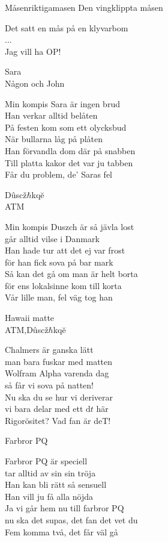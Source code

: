 \begin{song}{Måsen}{riktigamasen}
  {\Large Den vingklippta måsen}
  \begin{vers}
Det satt en mås på en klyvarbom \\
... \\
Jag vill ha OP! \\
\end{vers}
 

  {\Large Sara}\\{\tiny  Någon och John}
  \begin{vers}
Min kompis Sara är ingen brud\\
Han verkar alltid belåten\\
På festen kom som ett olycksbud\\
När bullarna låg på plåten\\
Han förvandla dom där på snabben\\
Till platta kakor det var ju tabben\\
Får du problem, de' Saras fel\\
\end{vers}

{\Large Dûscž$\hbar$kqĕ}\\{\tiny  ATM}
\begin{vers}
Min kompis Duszch är så jävla lost\\
går alltid vilse i Danmark\\
Han hade tur att det ej var frost\\
för han fick sova på bar mark\\
Så kan det gå om man är helt borta\\
för ens lokalsinne kom till korta\\
Vår lille man, fel väg tog han\\
\end{vers}

{\Large Hawaii matte}\\{\tiny  ATM,Dûscž$\hbar$kqĕ}
\begin{vers}

Chalmers är ganska lätt\\
man bara fuskar med matten\\
Wolfram Alpha varenda dag\\
så får vi sova på natten! \\
Nu ska du se hur vi deriverar\\
vi bara delar med ett $\mathrm{d}t$ här\\
Rigorösitet? Vad fan är deT! \\
\end{vers}

{\Large Farbror PQ}
\begin{vers}
Farbror PQ är speciell\\
tar alltid av sin sin tröja\\
Han kan bli rätt så sensuell\\
Han vill ju få alla nöjda\\
Ja vi går hem nu till farbror PQ\\
nu ska det supas, det fan det vet du\\
Fem komma två, det får väl gå
\end{vers}

\end{song}